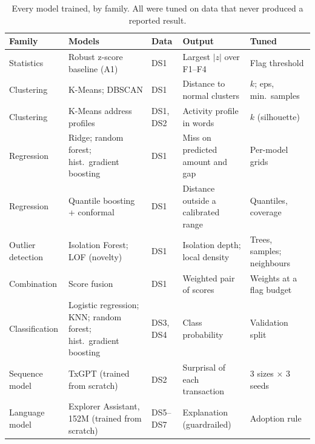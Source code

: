 \begin{table}[htbp]
\centering
\footnotesize
\caption{Every model trained, by family. All were tuned on data that never produced a reported result.}
\label{tab:candidates}
\begin{tabularx}{\textwidth}{@{}L{2.2cm} L{4.0cm} l L{3.4cm} Y@{}}
\toprule
Family & Models & Data & Output & Tuned \\
\midrule
Statistics & Robust z-score baseline (A1) & DS1 & Largest $|z|$ over F1--F4 & Flag threshold \\
Clustering & K-Means; DBSCAN & DS1 & Distance to normal clusters & $k$; eps, min.\ samples \\
Clustering & K-Means address profiles & DS1, DS2 & Activity profile in words & $k$ (silhouette) \\
Regression & Ridge; random forest; hist.\ gradient boosting & DS1 & Miss on predicted amount and gap & Per-model grids \\
Regression & Quantile boosting + conformal & DS1 & Distance outside a calibrated range & Quantiles, coverage \\
Outlier detection & Isolation Forest; LOF (novelty) & DS1 & Isolation depth; local density & Trees, samples; neighbours \\
Combination & Score fusion & DS1 & Weighted pair of scores & Weights at a flag budget \\
Classification & Logistic regression; KNN; random forest; hist.\ gradient boosting & DS3, DS4 & Class probability & Validation split \\
Sequence model & TxGPT (trained from scratch) & DS2 & Surprisal of each transaction & 3 sizes $\times$ 3 seeds \\
Language model & Explorer Assistant, 152M (trained from scratch) & DS5--DS7 & Explanation (guardrailed) & Adoption rule \\
\bottomrule
\end{tabularx}
\end{table}
